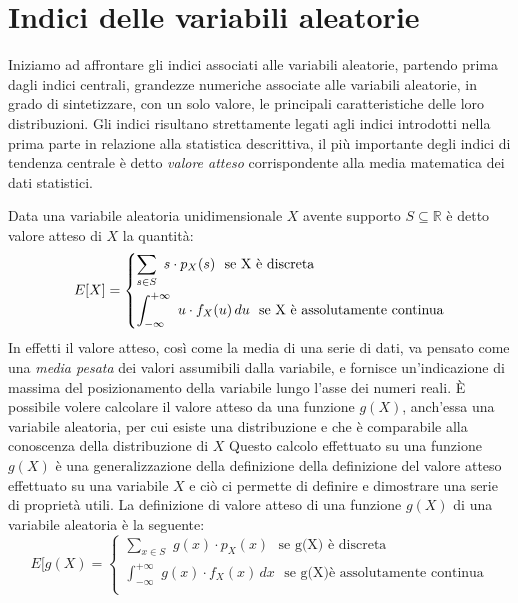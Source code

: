 \documentclass[a4paper,12pt, oneside]{book}
\newcommand{\numberset}{\mathbb}
\newcommand{\R}{\numberset{R}}
\begin{document}
\section{Indici delle variabili aleatorie}
Iniziamo ad affrontare gli indici associati alle variabili aleatorie, partendo prima dagli indici centrali,
grandezze numeriche associate alle variabili aleatorie, in grado di sintetizzare, con un solo valore,
le principali caratteristiche delle loro distribuzioni.\newline
Gli indici risultano strettamente legati agli indici introdotti nella prima parte in relazione alla 
statistica descrittiva, il più importante degli indici di tendenza centrale è detto \emph{valore atteso}
corrispondente alla media matematica dei dati statistici.

Data una variabile aleatoria unidimensionale $X$ avente supporto $S \subseteq \R$ è detto valore atteso di $X$ la quantità:
\[E[X] = \begin{dcases}
           \sum_{s\in S}\,\, s\cdot p_X(s) \,\,\mbox{ se X è discreta}\\
           \int_{-\infty}^{+\infty}\,\, u\cdot f_X(u)\,du \,\,\mbox{ se X è assolutamente continua}\\
         \end{dcases}\]
In effetti il valore atteso, così come la media di una serie di dati, va pensato come una \textit{media pesata}
dei valori assumibili dalla variabile, e fornisce un'indicazione di massima del posizionamento della variabile
lungo l'asse dei numeri reali.\newline
È possibile volere calcolare il valore atteso da una funzione $g(X)$, anch'essa una variabile aleatoria, per cui esiste
una distribuzione e che è comparabile alla conoscenza della distribuzione di $X$\newline
Questo calcolo effettuato su una funzione $g(X)$ è una generalizzazione della definizione della definizione del valore
atteso effettuato su una variabile $X$ e ciò ci permette di definire e dimostrare una serie di proprietà utili.\newline
La definizione di valore atteso di una funzione $g(X)$ di una variabile aleatoria è la seguente:
\[ E[g(X) = \begin{cases}
                \sum_{x\in S}\,\, g(x)\cdot p_X(x) \,\,\mbox{ se g(X) è discreta}\\
                \int_{-\infty}^{+\infty}\,\, g(x)\cdot f_X(x)\,dx \,\,\mbox{ se g(X)è assolutamente continua}\\
            \end{cases}\]
\end{document}
